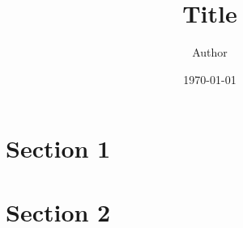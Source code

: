 \documentclass[10pt]{article}
\title{Title}
\author{Author}
\date{\today}
\begin{document}
\section{Section 1}
\label{sec:section-1}



\section{Section 2}
\label{sec:section-2}





\end{document}
